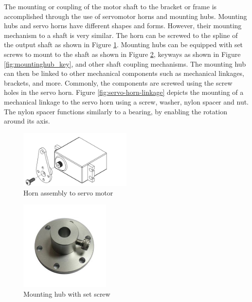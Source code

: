 The mounting or coupling of the motor shaft to the bracket or frame is accomplished through the use of servomotor horns and mounting hubs. Mounting hubs and servo horns have different shapes and forms. However, their mounting mechanism to a shaft is very similar. The horn can be screwed to the spline of the output shaft as shown in Figure \ref{fig:servo-horn}. Mounting hubs can be equipped with set screws to mount to the shaft as shown in Figure \ref{fig:mountinghub_screw}, keyways as shown in Figure \ref{fig:mountinghub_key}, and other shaft coupling mechanisms. The mounting hub can then be linked to other mechanical components such as mechanical linkages, brackets, and more. Commonly, the components are screwed using the screw holes in the servo horn. Figure \ref{fig:servo-horn-linkage} depicts the mounting of a mechanical linkage to the servo horn using a screw, washer, nylon spacer and nut. The nylon spacer functions similarly to a bearing, by enabling the rotation around its axis.

\begin{figure}[H]
    \centering
    \includegraphics[width=0.5\textwidth]{Sections/LiteratureReview/img/LegAssembly/horn_assembly.jpg}
    \caption{Horn assembly to servo motor \cite{pololu_pololu_nodate}}
    \label{fig:servo-horn}
\end{figure}

\begin{figure}[H]
    \centering
    \includegraphics[width=0.4\textwidth]{Sections/LiteratureReview/img/LegAssembly/MountingHub_screw.jpg}
    \caption{Mounting hub with set screw \cite{warbutech_nexus_nodate}}
    \label{fig:mountinghub_screw}
\end{figure}

